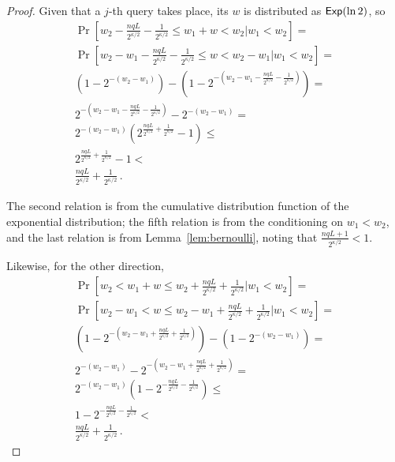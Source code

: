 \begin{proof}
  Given that a $j$-th query takes place, its $w$ is distributed as $\textsf{Exp}(\ln2)$,
  so
  \begin{align*}
    \Pr[w_2 - \frac{nqL}{2^{\kappa/2}} - \frac{1}{2^{\kappa/2}} \leq w_1 + w < w_2 | w_1 < w_2] = \\
    \Pr[w_2 - w_1 - \frac{nqL}{2^{\kappa/2}} - \frac{1}{2^{\kappa/2}} \leq w < w_2 - w_1 | w_1 < w_2] = \\
    (1 - 2^{-(w_2 - w_1)}) - (1 - 2^{-(w_2 - w_1 - \frac{nqL}{2^{\kappa/2}} - \frac{1}{2^{\kappa/2}})}) = \\
    2^{-(w_2 - w_1 - \frac{nqL}{2^{\kappa/2}} - \frac{1}{2^{\kappa/2}})} - 2^{-(w_2 - w_1)} = \\
    2^{-(w_2 - w_1)} (2^{\frac{nqL}{2^{\kappa/2}} + \frac{1}{2^{\kappa/2}}} - 1) \leq \\
    2^{\frac{nqL}{2^{\kappa/2}} + \frac{1}{2^{\kappa/2}}} - 1 < \\
    \frac{nqL}{2^{\kappa/2}} + \frac{1}{2^{\kappa/2}}\,.
  \end{align*}

  The second relation is from the cumulative distribution function of the exponential distribution;
  the fifth relation is from the conditioning on $w_1 < w_2$, and the last relation is from
  Lemma~\ref{lem:bernoulli}, noting that $\frac{nqL + 1}{2^{\kappa/2}} < 1$.

  Likewise, for the other direction,
  \begin{align*}
    \Pr[w_2 < w_1 + w \leq w_2 + \frac{nqL}{2^{\kappa/2}} + \frac{1}{2^{\kappa/2}} | w_1 < w_2] = \\
    \Pr[w_2 - w_1 < w \leq w_2 - w_1 + \frac{nqL}{2^{\kappa/2}} + \frac{1}{2^{\kappa/2}} | w_1 < w_2] = \\
    (1 - 2^{-(w_2 - w_1 + \frac{nqL}{2^{\kappa/2}} + \frac{1}{2^{\kappa/2}})}) - (1 - 2^{-(w_2 - w_1)}) = \\
    2^{-(w_2 - w_1)} - 2^{-(w_2 - w_1 + \frac{nqL}{2^{\kappa/2}} + \frac{1}{2^{\kappa/2}})} = \\
    2^{-(w_2 - w_1)} (1 - 2^{-\frac{nqL}{2^{\kappa/2}} - \frac{1}{2^{\kappa/2}}}) \leq \\
    1 - 2^{-\frac{nqL}{2^{\kappa/2}} - \frac{1}{2^{\kappa/2}}} < \\
    \frac{nqL}{2^{\kappa/2}} + \frac{1}{2^{\kappa/2}}\,.
  \end{align*}



\end{proof}
